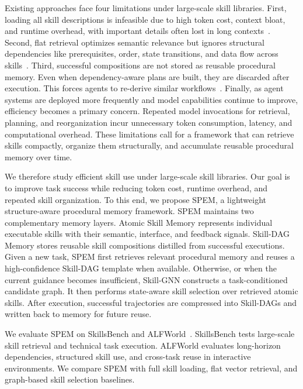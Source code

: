 \documentclass[letterpaper]{article} %
\newcommand{\model}{\textsc{SPEM}}
\begin{document}
Existing approaches face four limitations under large-scale skill libraries. First, loading all skill descriptions is infeasible due to high token cost,
context bloat, and runtime overhead, with important details often lost in long
contexts~\cite{liu2024lost}. Second, flat retrieval optimizes semantic relevance
but ignores structural dependencies like prerequisites, order, state
transitions, and data flow across skills~\cite{lewis2020rag,karpukhin2020dpr}.
Third, successful compositions are not stored as reusable procedural memory. Even
when dependency-aware plans are built, they are discarded after execution. This
forces agents to re-derive similar workflows~\cite{yao2023react,shinn2023reflexion}.
Finally, as agent systems are deployed more frequently and model capabilities continue to improve, efficiency becomes a primary concern. Repeated model invocations for retrieval, planning, and reorganization incur unnecessary token consumption, latency, and computational overhead. These limitations call for a framework that can retrieve skills compactly, organize them structurally, and accumulate reusable procedural memory over time.

We therefore study efficient skill use under large-scale skill
libraries. Our goal is to improve task success while reducing token cost,
runtime overhead, and repeated skill organization. To this end, we propose
\model{}, a lightweight structure-aware procedural memory framework. \model{}
maintains two complementary memory layers. Atomic Skill Memory represents
individual executable skills with their semantic, interface, and feedback
signals. Skill-DAG Memory stores reusable skill compositions distilled
from successful executions. Given a new task, \model{} first retrieves relevant
procedural memory and reuses a high-confidence Skill-DAG template when
available. Otherwise, or when the current guidance becomes insufficient,
Skill-GNN constructs a task-conditioned candidate graph. It then performs state-aware skill selection over retrieved atomic skills. After execution,
successful trajectories are compressed into Skill-DAGs and written back to
memory for future reuse.

We evaluate \model{} on SkillsBench and ALFWorld~\cite{li2026skillsbench,shridhar2020alfworld}.
SkillsBench tests large-scale skill retrieval and technical task execution. ALFWorld evaluates long-horizon dependencies, structured skill use, and
cross-task reuse in interactive environments. We compare \model{} with full
skill loading, flat vector retrieval, and graph-based skill selection baselines.
\end{document}
